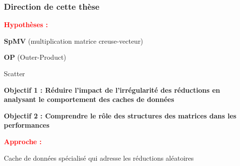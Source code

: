 \begin{frame}
    \frametitle{Direction de cette thèse}

    \textbf{\textcolor{Red}{Hypothèses :}}

    \smallskip

     \textbf{SpMV} (multiplication matrice creuse-vecteur)

    \smallskip

     \textbf{OP} (Outer-Product)

    \smallskip
    
     Scatter 

    \bigskip



    \bigskip

    \textbf{\textcolor{Mulberry}{Objectif 1 :} Réduire l'impact de l'irrégularité des réductions en analysant le comportement des caches de données}

    \medskip

    \textbf{\textcolor{Mulberry}{Objectif 2 :} Comprendre le rôle des structures des matrices dans les performances}

    \bigskip

    \textbf{\textcolor{Red}{Approche :}}

    \smallskip
    
     Cache de données spécialisé qui adresse les réductions \og aléatoires \fg{}

\end{frame}